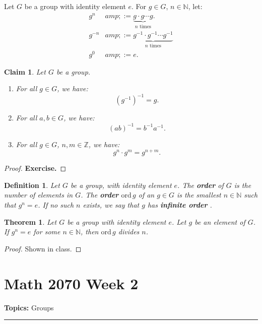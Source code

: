 \documentclass[a4paper,12pt]{report}
\newcommand{\ord}{\mathrm{ord}\,}
\renewcommand{\ord}{\mathrm{ord}\,}
\newcounter{statement}
\numberwithin{statement}{chapter}
\newtheorem{thm}[statement]{Theorem}
\newtheorem{defn}[statement]{Definition}
\newtheorem{claim}[statement]{Claim}
\numberwithin{equation}{chapter}
\numberwithin{section}{chapter}
\numberwithin{subsection}{section}
\begin{document}
Let $G$ be a group with identity element $e$.
For $g \in G$, $n \in \mathbb{N}$,
let:
\[\begin{split}
g^n &amp;:= \underbrace{g \cdot g \cdots g}_{n\text{ times}}.\\
g^{-n} &amp;:= \underbrace{g^{-1} \cdot g^{-1} \cdots g^{-1}}_{n\text{ times}}\\
g^0 &amp;:= e.
\end{split}\]
\begin{claim}

Let $G$ be a group.
\begin{enumerate}
\item 
For all $g \in G$,
we have:
\[(g^{-1})^{-1} = g.\]
  
\item 
For all $a, b \in G$,
we have:
\[(ab)^{-1} = b^{-1}a^{-1}.\]
  
\item 
For all $g \in G$, $n, m \in \mathbb{Z}$, we have:
\[g^n\cdot g^m = g^{n + m}.\]
  \end{enumerate}
\end{claim}
\begin{proof}

 {\bf Exercise.} 
\end{proof}

\begin{defn}
Let $G$ be a group, with identity element $e$.
The  {\bf order}  of $G$ is the number of elements in $G$.
The  {\bf order}  $\ord g$ of an  $g \in G$
is the smallest $n \in \mathbb{N}$ such that $g^n = e$.
If no such $n$ exists, we say that $g$ has  {\bf infinite order} .
\end{defn}
\begin{thm}

Let $G$ be a group with identity element $e$.
Let $g$ be an element of $G$. If $g^n = e$ for some $n \in \mathbb{N}$,
then $\ord g$ divides $n$.
\end{thm}
\begin{proof}

Shown in class.
\end{proof}
\setcounter{chapter}{2}\setcounter{section}{0}
\setcounter{subsection}{0}
\setcounter{statement}{0}

\chapter*{Math 2070 Week 2}
{\bf Topics: }Groups
\hrule
\end{document}
